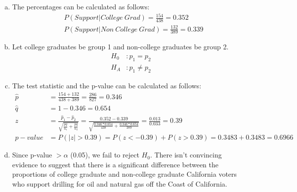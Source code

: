 {
\begin{enumerate}[(a)]
\item The percentages can be calculated as follows:
\begin{align*}
&P(Support | College~Grad) = \frac{154}{438} = 0.352 \\
&P(Support | Non~College~Grad) = \frac{132}{389} = 0.339
\end{align*}
\item Let college graduates be group 1 and non-college graduates be group 2.
\begin{align*}
H_0&: p_1 = p_2 \\
H_A&: p_1 \ne p_2
\end{align*}
\item The test statistic and the p-value can be calculated as follows:
\begin{align*}
\hat{p} &= \frac{154 + 132}{438 + 389} = \frac{286}{827} = 0.346 \\
\hat{q} &= 1 - 0.346 =  0.654 \\
z &= \frac{\hat{p}_1 - \hat{p}_2}{\sqrt{ \frac{\hat{p}  \hat{q} }{n_1} + \frac{\hat{p} \hat{q} }{n_2} } } =  \frac{0.352 - 0.339}{\sqrt{ \frac{0.346  * 0.654 }{438} + \frac{ 0.346  * 0.654 }{389} } } = \frac{0.013}{0.033} = 0.39 \\
p-value &= P(|z| > 0.39) = P(z < -0.39) + P(z > 0.39) = 0.3483 + 0.3483 = 0.6966
\end{align*}
\item Since p-value $> \alpha$ (0.05), we fail to reject $H_0$. There isn't convincing evidence to suggest that there is a significant difference between the proportions of college graduate and non-college graduate California voters who support drilling for oil and natural gas off the Coast of California.
\end{enumerate}
}

